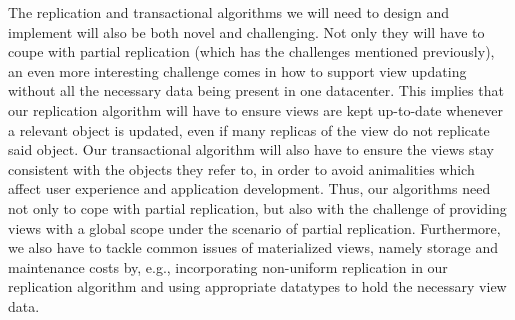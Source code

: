 The replication and transactional algorithms we will need to design and implement will also be both novel and challenging.
Not only they will have to coupe with partial replication (which has the challenges mentioned previously), an even more interesting challenge comes in how to support view updating without all the necessary data being present in one datacenter.
This implies that our replication algorithm will have to ensure views are kept up-to-date whenever a relevant object is updated, even if many replicas of the view do not replicate said object.
Our transactional algorithm will also have to ensure the views stay consistent with the objects they refer to, in order to avoid animalities which affect user experience and application development.
Thus, our algorithms need not only to cope with partial replication, but also with the challenge of providing views with a global scope under the scenario of partial replication.
Furthermore, we also have to tackle common issues of materialized views, namely storage and maintenance costs by, e.g., incorporating non-uniform replication in our replication algorithm and using appropriate datatypes to hold the necessary view data.




